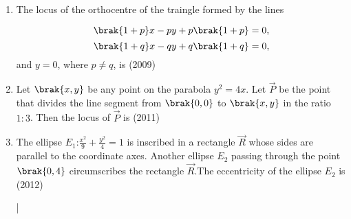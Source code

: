 \begin{enumerate}
\item The locus of the orthocentre of the traingle formed by the lines
		
			$$\brak{1+p}x-py+p\brak{1+p}=0,$$
			$$\brak{1+q}x-qy+q\brak{1+q}=0,$$
		and $y=0$, where $p \neq q$, is
		\hfill(2009)
\begin{enumerate}
\end{enumerate}

	\item Let $\brak{x,y}$ be any point on the parabola $y^2=4x$. Let $\vec{P}$ be the point that divides the line segment from $\brak{0,0}$ to $\brak{x,y}$ in the ratio $1:3$. Then the locus of $\vec{P}$ is  \hfill(2011)\\
		\begin{enumerate}
		\end{enumerate}

	\item The ellipse $E_{1}$:$\frac{x^2}{9}+\frac{y^2}{4}=1$ is inscribed in a rectangle $\vec{R}$ whose sides are parallel to the coordinate axes. Another ellipse $E_{2}$ passing through the point $\brak{0,4}$ circumscribes the rectangle $\vec{R}$.The eccentricity of the ellipse $E_{2}$ is \hfill(2012)\\

		\begin{enumerate}
				\begin{multicols}{2}
			\item $\frac{\sqrt{2}}{2}$
			\item $\frac{\sqrt{3}}{2}$
				\columnbreak
			\item $\frac{1}{2}$
			\item $\frac{3}{4}$
				\end{multicols}|
		\end{enumerate}


\end{enumerate}
